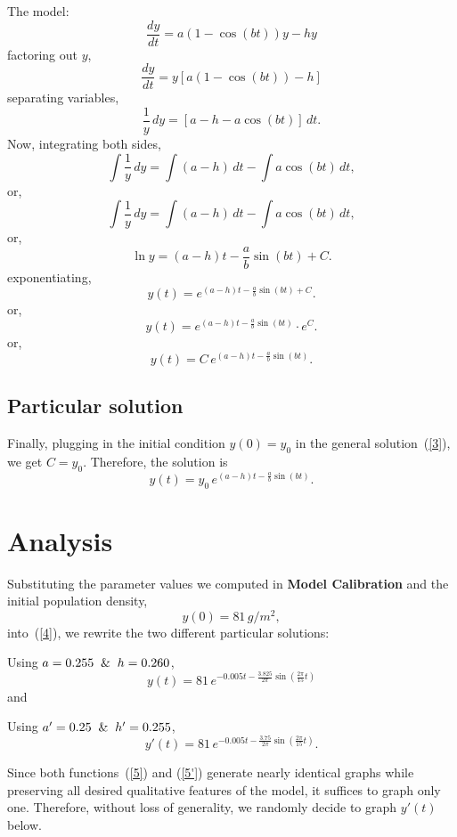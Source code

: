 \documentclass[11pt]{article}
\begin{document}
The model:
\[
\frac{dy}{dt} = a(1 - \cos(bt))y - hy
\]
factoring out $y$,
\[
\frac{dy}{dt} = y[a(1 - \cos(bt)) - h]
\]
separating variables,
\[
\frac{1}{y}\, dy = [a - h - a\cos(bt)]\, dt .
\]
Now, integrating both sides,
\[
\int \frac{1}{y}\, dy = \int (a-h)\,dt - \int a\cos(bt)\,dt,
\]
or,
\[
\int \frac{1}{y}\, dy = \int (a-h)\,dt - \int a\cos(bt)\, dt,
\]
or,
\[
\ln y = (a-h)t - \frac{a}{b}\sin(bt) + C.
\]
exponentiating,
\[
y(t)=e^{(a-h)t-\frac{a}{b}\sin(bt)+C}.
\]
or,
\[
y(t)=e^{(a-h)t-\frac{a}{b}\sin(bt)} \cdot e^C.
\]
or,
\begin{equation}
    y(t)=C\,e^{(a-h)t-\frac{a}{b}\sin(bt)}.
    \label{3}
    \tag{3}
\end{equation}

\subsection{Particular solution}

Finally, plugging in the initial condition $y(0)=y_0$ in the general solution~(\ref{3}), we get $C=y_0$. Therefore, the solution is
\begin{equation}
    y(t)=y_0\,e^{(a-h)t-\frac{a}{b}\sin(bt)}.
    \label{4}
    \tag{4}
\end{equation}

\section{Analysis}

Substituting the parameter values we computed in \textbf{Model Calibration} and the initial population density,
\[
y(0) = 81\, g/m^2,
\]
into~(\ref{4}), we rewrite the two different particular solutions:

Using $a = 0.255 \And h = 0.260$,
\begin{equation}
    y(t)=81\,e^{-0.005t-\frac{3.825}{2\pi}\sin(\frac{2\pi}{15}t)}
    \label{5}
    \tag{5}
\end{equation}
and

Using $a' = 0.25 \And h' = 0.255$,
\begin{equation}
    y'(t)=81\,e^{-0.005t-\frac{3.75}{2\pi}\sin(\frac{2\pi}{15}t)}.
    \label{5'}
    \tag{5'}
\end{equation}

Since both functions~(\ref{5}) and (\ref{5'}) generate nearly identical graphs while preserving all desired qualitative features of the model, it suffices to graph only one. Therefore, without loss of generality, we randomly decide to graph $y'(t)$ below.
\end{document}
